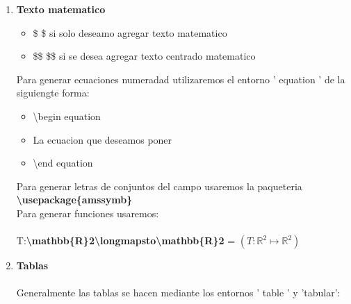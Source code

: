 \documentclass[spanish,12pt,a4paper]{book}%
\begin{document}
\begin{enumerate}
	Es normal querer hacer mencion o citar cosa dentro del mismo documento para eso usaremos los hipertextos y etiquetas:
	\\\\
	Usaremos la paqueteria\textbf{ \textbackslash usepackage 'hyperreg'}y con el comando \textbf{\textbackslash label 'nombre-enlace'} definiremos el nombre del enlace dentro del documento al cual se podra hacer referencia posteriormente mediante\textbf{ \textbackslash ref}
	\\\\Añadire al documento dicha libreria y referenciare cualquier cosa para verla aqui:\ref{Tomamos el capitulo o en este caso el item}	\\\\
	Tambien se puede hacer referencia de una figura o tabla, si se desea agregar URL ent usaremos los comandos \textbf{\textbackslash url} o si se desea poner un texto alternativo se usara el comando \textbf{\textbackslash href}
	\\\\
\item \textbf{Texto matematico} 
	\begin{itemize}
		\item \$ \$ si solo deseamo agregar texto matematico
		\item \$\$ \$\$ si se desea agregar texto centrado matematico
	\end{itemize}
	Para generar ecuaciones numeradad utilizaremos el entorno ' equation ' de la siguiengte forma:
	\begin{itemize}	
	\item \textbackslash begin equation
	\item La ecuacion que deseamos poner
	\item \textbackslash end equation
	\end{itemize}	
	Para generar letras de conjuntos del campo usaremos la paqueteria \textbf{\textbackslash usepackage\{amssymb\}}\\
	Para generar funciones usaremos:\\\\
	 T:\textbf{\textbackslash mathbb\{R\}2\textbackslash longmapsto\textbackslash mathbb\{R\}2} = $(T:\mathbb{R}^2\longmapsto\mathbb{R}^2)$
\item \textbf{Tablas}\\\\
	Generalmente las tablas se hacen mediante los entornos ' table ' y 'tabular':
	\begin{itemize}

\end{itemize}
\end{enumerate}
\end{document}
